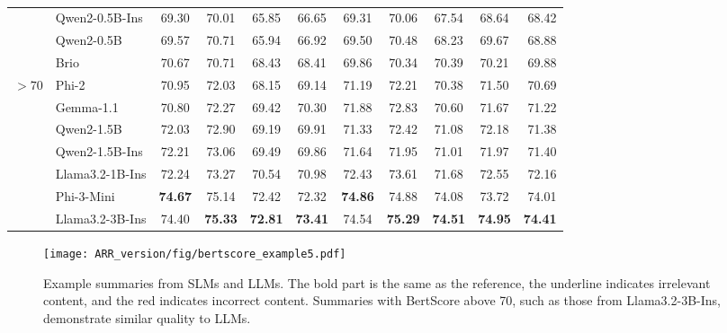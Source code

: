 \begin{table*}[]
\begin{center}
{\begin{tabular}{llccccccccr}
                    & Qwen2-0.5B-Ins & 69.30       & 70.01      & 65.85   & 66.65   &69.31   & 70.06 & 67.54 & 68.64        & 68.42   \\
                    & Qwen2-0.5B          & 69.57   & 70.71  & 65.94   & 66.92  & 69.50   & 70.48  & 68.23   & 69.67  & 68.88                \\
                    &Brio   & 70.67  & 70.71  &68.43  & 68.41   &69.86  &70.34  &70.39  & 70.21  & 69.88  \\ \hline
\multirow{7}{*}{$> 70$} & Phi-2              & 70.95   & 72.03  & 68.15   & 69.14  & 71.19   & 72.21  & 70.38   & 71.50  & 70.69                \\
                    & Gemma-1.1          & 70.80   & 72.27  & 69.42   & 70.30  & 71.88   & 72.83  & 70.60   & 71.67  & 71.22                \\
                    & Qwen2-1.5B          & 72.03   & 72.90  & 69.19   & 69.91  & 71.33   & 72.42  & 71.08   & 72.18  & 71.38                \\
                    & Qwen2-1.5B-Ins      & 72.21   & 73.06  & 69.49   & 69.86  & 71.64   & 71.95  & 71.01   & 71.97  & 71.40                \\
                    & Llama3.2-1B-Ins     & 72.24   & 73.27  & 70.54   & 70.98  & 72.43   & 73.61  & 71.68   & 72.55  & 72.16                \\
                    & Phi-3-Mini         & \textbf{74.67}   & {75.14}  & {72.42}   & {72.32}  & \textbf{74.86}   & {74.88}  & {74.08}   & {73.72}  & {74.01} \\  
                    & Llama3.2-3B-Ins     & 74.40   & \textbf{75.33}  & \textbf{72.81}   & \textbf{73.41}  & 74.54   & \textbf{75.29}  & \textbf{74.51}   & \textbf{74.95}  & \textbf{74.41}   \\ \hline
                  
\end{tabular}}
\end{center}
\caption{}
\label{tab:bertscore_res}
\end{table*}


\begin{figure}
    \centering
    \texttt{[image: ARR\_version/fig/bertscore\_example5.pdf]}
    \caption{ Example summaries from SLMs and LLMs. The bold part is the same as the reference, the underline indicates irrelevant content, and the red indicates incorrect content. Summaries with BertScore above 70, such as those from Llama3.2-3B-Ins, demonstrate similar quality to LLMs. }
    \label{fig:bertscore_example}
\end{figure}

